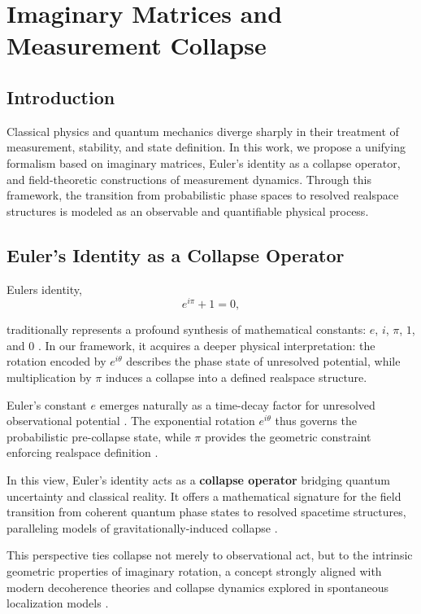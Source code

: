 \chapter{Imaginary Matrices and Measurement Collapse}

\section{Introduction}
Classical physics and quantum mechanics diverge sharply in their treatment of measurement, stability, and state definition. In this work, we propose a unifying formalism based on imaginary matrices, Euler's identity as a collapse operator, and field-theoretic constructions of measurement dynamics. Through this framework, the transition from probabilistic phase spaces to resolved realspace structures is modeled as an observable and quantifiable physical process.

\section{Euler's Identity as a Collapse Operator}

Eulers identity,
\[
e^{i\pi} + 1 = 0,
\]

traditionally represents a profound synthesis of mathematical constants: $e$, $i$, $\pi$, $1$, and $0$ \cite{euler_formula_foundation,euler_complex_plane}. In our framework, it acquires a deeper physical interpretation: the rotation encoded by $e^{i\theta}$ describes the phase state of unresolved potential, while multiplication by $\pi$ induces a collapse into a defined realspace structure.

Euler's constant $e$ emerges naturally as a time-decay factor for unresolved observational potential \cite{courant1941methods}. The exponential rotation $e^{i\theta}$ thus governs the probabilistic pre-collapse state, while $\pi$ provides the geometric constraint enforcing realspace definition \cite{euler_rotation_theorem}.

In this view, Euler's identity acts as a \textbf{collapse operator} bridging quantum uncertainty and classical reality. It offers a mathematical signature for the field transition from coherent quantum phase states to resolved spacetime structures, paralleling models of gravitationally-induced collapse \cite{penrose_gravity_1996}.

This perspective ties collapse not merely to observational act, but to the intrinsic geometric properties of imaginary rotation, a concept strongly aligned with modern decoherence theories \cite{zurek_decoherence} and collapse dynamics explored in spontaneous localization models \cite{bassi_models_2013}.

